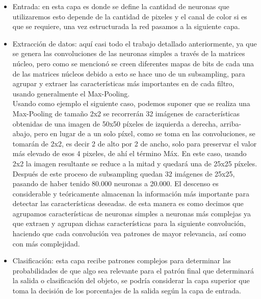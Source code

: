 \documentclass[a4paper, 12pt]{article}
\begin{document}
    \begin{itemize}
    \item Entrada: en esta capa es donde se define la cantidad de neuronas que utilizaremos esto depende de la cantidad de pixeles y el canal de color si es que se requiere, una vez estructurada la red pasamos a la siguiente capa. 

    \item Extracción de datos: aquí casi todo el trabajo detallado anteriormente, ya que se genera las convoluciones de las neuronas simples a través de la matrices núcleo, pero como se mencionó se creen diferentes mapas de bits de cada una de las matrices núcleos debido a esto se hace uno de un subsampling, para agrupar y extraer las características más importantes en de cada filtro, usando generalmente el Max-Pooling.\\

    Usando como ejemplo el siguiente caso, podemos suponer que se realiza una Max-Pooling de tamaño 2x2 se recorrerán 32 imágenes de características obtenidas de una imagen de 50x50 píxeles de izquierda a derecha, arriba-abajo, pero en lugar de a un solo píxel, como se toma en las convoluciones, se tomarán de 2x2, es decir 2 de alto por 2 de ancho, solo para preservar el valor más elevado de esos 4 pixeles, de ahí el término Máx. En este caso, usando 2x2 la imagen resultante se reduce a la mitad y quedará una de 25x25 píxeles. Después de este proceso de subsampling quedan 32 imágenes de 25x25, pasando de haber tenido 80.000 neuronas a 20.000. El descenso es considerable y teóricamente almacenan la información más importante para detectar las características deseadas. de esta manera es como decimos que agrupamos características de neuronas simples a neuronas más complejas ya que extraen y agrupan dichas características para la siguiente convolución, haciendo que cada convolución vea patrones de mayor relevancia, así como con más complejidad. 

    \item Clasificación: esta capa recibe patrones complejos para determinar las probabilidades de que algo sea relevante para el patrón final que determinará la salida o clasificación del objeto, se podría considerar la capa superior que toma la decisión de los porcentajes de la salida según la capa de entrada. 
    \end{itemize}
\end{document}
